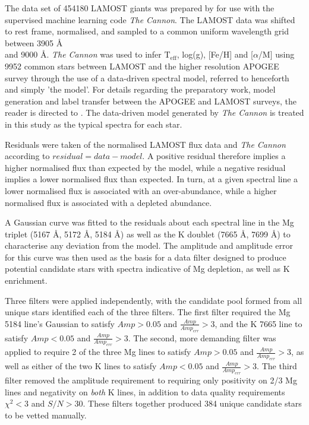 \documentclass[a4paper,fleqn,usenatbib]{mnras}
\begin{document}
The data set of 454180 LAMOST giants was prepared by \citet{ho2017} for use with the supervised machine learning code \textit{The Cannon}. The LAMOST data was shifted to rest frame, normalised, and sampled to a common uniform wavelength grid between 3905 \AA \\ and 9000 \AA. \textit{The Cannon} was used to infer $\text{T}_{\text{eff}}$, log(g), [Fe/H] and [$\alpha$/M] using 9952 common stars between LAMOST and the higher resolution APOGEE survey through the use of a data-driven spectral model, referred to henceforth and simply 'the model'. For details regarding the preparatory work, model generation and label transfer between the APOGEE and LAMOST surveys, the reader is directed to \citet{ho2017}. The data-driven model generated by \textit{The Cannon} is treated in this study as the typical spectra for each star.

Residuals were taken of the normalised LAMOST flux data and 
\textit{The Cannon} according to $residual=data-model$. A positive residual therefore implies a higher normalised flux than expected by the model, while a negative residual implies a lower normalised flux than expected. In turn, at a given spectral line a lower normalised flux is associated with an over-abundance, while a higher normalised flux is associated with a depleted abundance.

A Gaussian curve was fitted to the residuals about each spectral line in the Mg triplet (5167 \AA, 5172 \AA, 5184 \AA) as well as the K doublet (7665 \AA, 7699 \AA) to characterise any deviation from the model. The amplitude and amplitude error for this curve was then used as the basis for a data filter designed to produce potential candidate stars with spectra indicative of Mg depletion, as well as K enrichment.

Three filters were applied independently, with the candidate pool formed from all unique stars identified each of the three filters. The first filter required the Mg 5184 line's Gaussian to satisfy $Amp > 0.05$ and $\frac{Amp}{Amp_{err}}>3$, and the K 7665 line to satisfy $Amp < 0.05$ and $\frac{Amp}{Amp_{err}}>3$. The second, more demanding filter was applied to require 2 of the three Mg lines to satisfy $Amp > 0.05$ and $\frac{Amp}{Amp_{err}}>3$, as well as either of the two K lines to satisfy $Amp < 0.05$ and $\frac{Amp}{Amp_{err}}>3$. The third filter removed the amplitude requirement to requiring only positivity on 2/3 Mg lines and negativity on \textit{both} K lines, in addition to data quality requirements $\chi^2<3$ and $S/N>30$.
These filters together produced 384 unique candidate stars to be vetted manually.
\end{document}
